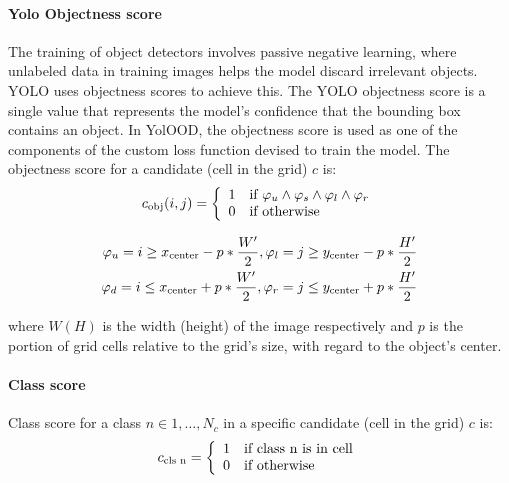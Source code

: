 \paragraph{Yolo Objectness score}
The training of object detectors involves passive negative learning, where unlabeled data in training images helps the model discard irrelevant objects. YOLO uses objectness scores to achieve this. 
The YOLO objectness score is a single value that represents the model's confidence that the bounding box contains an object. 
In YolOOD, the objectness score is used as one of the components of the custom loss function devised to train the model. 
The objectness score for a candidate (cell in the grid) $c$ is:
\begin{equation}
\centering
c_{\text{obj}}(i,j) =
\left\{
    \begin{array}{ll}
        1  & \mbox{if } \varphi_u \wedge \varphi_s \wedge \varphi_l \wedge \varphi_r \\
        0  & \mbox{if } \text{otherwise}
    \end{array}
\right.
\end{equation}

\begin{equation}
\centering
\begin{aligned}
\varphi_u = i \geq x_{\text{center}} - p * \frac{W'}{2}, \varphi_l = j \geq y_{\text{center}} - p * \frac{H'}{2} \\
\varphi_d = i \leq x_{\text{center}} + p * \frac{W'}{2}, \varphi_r = j \leq y_{\text{center}} + p * \frac{H'}{2}
\end{aligned}
\end{equation}

where $W (H)$ is the width (height) of the image respectively and $p$ is the portion of grid cells relative to the grid’s size, with regard to the object’s center.

\paragraph{Class score}
Class score for a class $n \in {1, \dots , N_c}$ in a specific candidate (cell in the grid) $c$ is:
\begin{equation}
\centering
c_{\text{cls n}} =
\left\{
    \begin{array}{ll}
        1  & \mbox{if } \text{class n is in cell} \\
        0  & \mbox{if } \text{otherwise}
    \end{array}
\right.
\end{equation}

